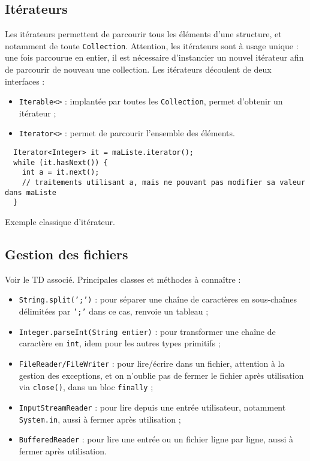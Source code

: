 \documentclass[10pt]{article}
\begin{document}
\subsection{Itérateurs}

Les itérateurs permettent de parcourir tous les éléments d'une structure, et notamment de toute \texttt{Collection}.
Attention, les itérateurs sont à usage unique : une fois parcourue en entier, il est nécessaire d'instancier un nouvel itérateur
afin de parcourir de nouveau une collection. Les itérateurs découlent de deux interfaces :
\begin{itemize}
\item \texttt{Iterable<>} : implantée par toutes les \texttt{Collection}, permet d'obtenir un itérateur ;
\item \texttt{Iterator<>} : permet de parcourir l'ensemble des éléments.
\end{itemize}

\begin{listing}[h!]
\begin{verbatim}
  Iterator<Integer> it = maListe.iterator();
  while (it.hasNext()) {
    int a = it.next();
    // traitements utilisant a, mais ne pouvant pas modifier sa valeur dans maListe
  }
\end{verbatim}
\caption{Exemple classique d'itérateur.
\label{lst.iterator}}
\end{listing}


\subsection{Gestion des fichiers}

Voir le TD associé. Principales classes et méthodes à connaître :
\begin{itemize}
\item \texttt{String.split(';')} : pour séparer une chaîne de caractères en sous-chaînes délimitées par \texttt{';'} dans ce cas, renvoie un tableau ;
\item \texttt{Integer.parseInt(String entier)} : pour transformer une chaîne de caractère en \texttt{int}, idem pour les autres types primitifs ;
\item \texttt{FileReader/FileWriter} : pour lire/écrire dans un fichier, attention à la gestion des exceptions,
  et on n'oublie pas de fermer le fichier après utilisation via \texttt{close()}, dans un bloc \texttt{finally} ;
\item \texttt{InputStreamReader} : pour lire depuis une entrée utilisateur, notamment \texttt{System.in}, aussi à fermer après utilisation ;
\item \texttt{BufferedReader} : pour lire une entrée ou un fichier ligne par ligne, aussi à fermer après utilisation.
\end{itemize}
\end{document}
